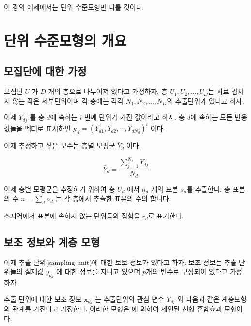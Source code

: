 \documentclass[
]{book}
\newcommand{\bm}[1]{ \symbf{#1}}
\begin{document}
이 강의 예제에서는 단위 수준모형만 다룰 것이다.

\hypertarget{uxb2e8uxc704-uxc218uxc900uxbaa8uxd615uxc758-uxac1cuxc694}{%
\section{단위 수준모형의 개요}\label{uxb2e8uxc704-uxc218uxc900uxbaa8uxd615uxc758-uxac1cuxc694}}

\hypertarget{uxbaa8uxc9d1uxb2e8uxc5d0-uxb300uxd55c-uxac00uxc815}{%
\subsection{모집단에 대한 가정}\label{uxbaa8uxc9d1uxb2e8uxc5d0-uxb300uxd55c-uxac00uxc815}}

모집딘 \(U\) 가 \(D\) 개의 층으로 나누어져 있다고 가정하자, 층 \(U_1, U_2, \dots, U_D\)는
서로 겹치지 않는 작은 세부단위이며 각 층에는 각각 \(N_1, N_2, \dots, N_D\)의 추출단위가 있다고 하자.

이제 \(Y_{dj}\) 를 층 \(d\)에 속하는 \(i\) 번째 단위가 가진 값이라고 하자. 층 \(d\)에 속하는 모든 반응값들을 벡터로 표시하면 \(\bm y_d = (Y_{d1}, Y_{d2}, \cdots, Y_{dN_{d}})^t\) 이다.

이제 추정하고 싶은 모수는 층별 모평균 \(\bar Y_d\) 이다.

\[ \bar Y_d = \frac{ \sum_{j=1}^{N_s} Y_{dj} } { N_d} \]

이제 층별 모평균을 추정하기 위하여 층 \(U_d\) 에서 \(n_d\) 개의 표본 \(s_d\)를 추츨한다.
총 표본의 수 \(n= \sum_d n_d\) 는 각 층에서 추출한 표본의 수의 합니다.

소지역에서 표본에 속하지 않는 단위들의 집합을 \(r_d\)로 표기한다.

\hypertarget{uxbcf4uxc870-uxc815uxbcf4uxc640-uxacc4uxce35-uxbaa8uxd615}{%
\subsection{보조 정보와 계층 모형}\label{uxbcf4uxc870-uxc815uxbcf4uxc640-uxacc4uxce35-uxbaa8uxd615}}

이제 추출 단위(sampling unit)에 대한 보보 정보가 있다고 하자.
보조 정보는 추출 단위들의 실제값 \(y_{dj}\) 에 대한 정보를 지니고 있으며 \(p\)개의 변수로 구성되어 있다고 가정하자.

추출 단위에 대한 보조 정보 \(\bm x_{dj}\) 는 추출단위의 관심 변수 \(Y_{dj}\) 와 다음과 같은 계층보형의 관계를 가진다고 가정한다.
이러한 모형은 \citep{battese1988error}에 의하여 제안된 선형 혼합효과 모형이다.
\end{document}
